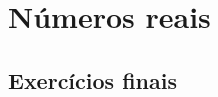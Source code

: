 
\chapter{Números reais}\label{cap:números_reais}

\emconstrucao

\section{Exercícios finais}

\construirExer
